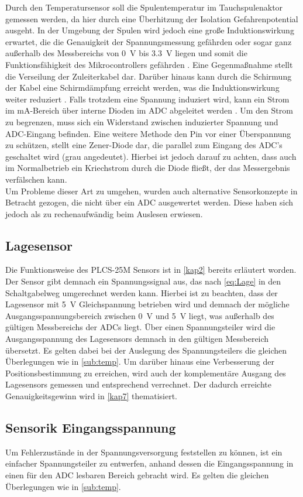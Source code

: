 Durch den Temperatursensor soll die Spulentemperatur im Tauchspulenaktor gemessen werden, da hier durch eine Überhitzung der Isolation Gefahrenpotential ausgeht. In der Umgebung der Spulen wird jedoch eine große Induktionswirkung erwartet, die die Genauigkeit der Spannungsmessung gefährden oder sogar ganz außerhalb des Messbereichs von \SI{0}{V} bis \SI{3,3}{V} liegen und somit die Funktionsfähigkeit des Mikrocontrollers gefährden \cite{stm32}. Eine Gegenmaßnahme stellt die Verseilung der Zuleiterkabel dar. Darüber hinaus kann durch die Schirmung der Kabel eine Schirmdämpfung erreicht werden, was die Induktionswirkung weiter reduziert \cite{Wolfsperger}. Falls trotzdem eine Spannung induziert wird, kann ein  Strom im mA-Bereich über interne Dioden im ADC abgeleitet werden \cite{stmref}. Um den Strom zu begrenzen, muss sich ein Widerstand zwischen induzierter Spannung und ADC-Eingang befinden. Eine weitere Methode den Pin vor einer Überspannung zu schützen, stellt eine Zener-Diode dar, die parallel zum Eingang des ADC's geschaltet wird (grau angedeutet). Hierbei ist jedoch darauf zu achten, dass auch im Normalbetrieb ein Kriechstrom durch die Diode fließt, der das Messergebnis verfälschen kann. \\
Um Probleme dieser Art zu umgehen, wurden auch alternative Sensorkonzepte in Betracht gezogen, die nicht über ein ADC ausgewertet werden. Diese haben sich jedoch als zu rechenaufwändig beim Auslesen erwiesen.

\subsection{Lagesensor}
Die Funktionsweise des PLCS-25M Sensors ist in \autoref{kap2} bereits erläutert worden. Der Sensor gibt demnach ein Spannungssignal aus, das nach \autoref{eq:Lage} in den Schaltgabelweg umgerechnet werden kann. Hierbei ist zu beachten, dass der Lagesensor mit \SI{5}{V} Gleichspannung betrieben wird und demnach der mögliche Ausgangsspannungsbereich zwischen \SI{0}{V} und \SI{5}{V} liegt, was außerhalb des gültigen Messbereichs der ADCs liegt. Über einen Spannungsteiler wird die Ausgangsspannung des Lagesensors demnach in den gültigen Messbereich übersetzt. Es gelten dabei bei der Auslegung des Spannungsteilers die gleichen Überlegungen wie in \autoref{sub:temp}. Um darüber hinaus eine Verbesserung der Positionsbestimmung zu erreichen, wird auch der komplementäre Ausgang des Lagesensors gemessen und entsprechend verrechnet. Der dadurch erreichte Genauigkeitsgewinn wird in \autoref{kap7} thematisiert.

\subsection{Sensorik Eingangsspannung}\label{eingangsspannung}
Um Fehlerzustände in der Spannungsversorgung feststellen zu können, ist ein einfacher Spannungsteiler zu entwerfen, anhand dessen die Eingangsspannung in einen für den ADC lesbaren Bereich gebracht wird. Es gelten die gleichen Überlegungen wie in \autoref{sub:temp}.

